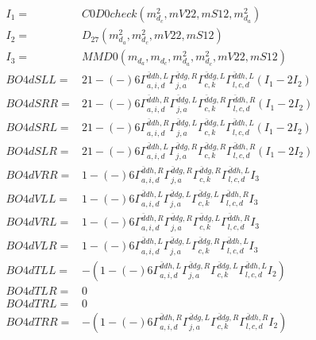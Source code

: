 \documentclass[A4,landscape]{article}
\begin{document}
\begin{align} 
I_1 = & C0D0check(m^2_{d_{{c}}}, mV22, mS12, m^2_{d_{{a}}}) \\ 
I_2 = & D_{27}(m^2_{d_{{a}}}, m^2_{d_{{c}}}, mV22, mS12) \\ 
I_3 = & MMD0(m_{d_{{a}}}, m_{d_{{c}}}, m^2_{d_{{a}}}, m^2_{d_{{c}}}, mV22, mS12) \\ 
  BO4dSLL= & 2   1
-(-)
  6 \Gamma^{\bar{d}d h ,L}_{a, i, d} \Gamma^{\bar{d}d g ,R}_{j, a} \Gamma^{\bar{d}d g ,L}_{c, k} \Gamma^{\bar{d}d h ,L}_{l, c, d} (I_1 - 2 I_2) \\ 
  BO4dSRR= & 2   1
-(-)
  6 \Gamma^{\bar{d}d h ,R}_{a, i, d} \Gamma^{\bar{d}d g ,L}_{j, a} \Gamma^{\bar{d}d g ,R}_{c, k} \Gamma^{\bar{d}d h ,R}_{l, c, d} (I_1 - 2 I_2) \\ 
  BO4dSRL= & 2   1
-(-)
  6 \Gamma^{\bar{d}d h ,R}_{a, i, d} \Gamma^{\bar{d}d g ,L}_{j, a} \Gamma^{\bar{d}d g ,L}_{c, k} \Gamma^{\bar{d}d h ,L}_{l, c, d} (I_1 - 2 I_2) \\ 
  BO4dSLR= & 2   1
-(-)
  6 \Gamma^{\bar{d}d h ,L}_{a, i, d} \Gamma^{\bar{d}d g ,R}_{j, a} \Gamma^{\bar{d}d g ,R}_{c, k} \Gamma^{\bar{d}d h ,R}_{l, c, d} (I_1 - 2 I_2) \\ 
  BO4dVRR= &   1
-(-)
  6 \Gamma^{\bar{d}d h ,R}_{a, i, d} \Gamma^{\bar{d}d g ,R}_{j, a} \Gamma^{\bar{d}d g ,R}_{c, k} \Gamma^{\bar{d}d h ,L}_{l, c, d} I_3 \\ 
  BO4dVLL= &   1
-(-)
  6 \Gamma^{\bar{d}d h ,L}_{a, i, d} \Gamma^{\bar{d}d g ,L}_{j, a} \Gamma^{\bar{d}d g ,L}_{c, k} \Gamma^{\bar{d}d h ,R}_{l, c, d} I_3 \\ 
  BO4dVRL= &   1
-(-)
  6 \Gamma^{\bar{d}d h ,R}_{a, i, d} \Gamma^{\bar{d}d g ,R}_{j, a} \Gamma^{\bar{d}d g ,L}_{c, k} \Gamma^{\bar{d}d h ,R}_{l, c, d} I_3 \\ 
  BO4dVLR= &   1
-(-)
  6 \Gamma^{\bar{d}d h ,L}_{a, i, d} \Gamma^{\bar{d}d g ,L}_{j, a} \Gamma^{\bar{d}d g ,R}_{c, k} \Gamma^{\bar{d}d h ,L}_{l, c, d} I_3 \\ 
  BO4dTLL= & -(  1
-(-)
  6 \Gamma^{\bar{d}d h ,L}_{a, i, d} \Gamma^{\bar{d}d g ,R}_{j, a} \Gamma^{\bar{d}d g ,L}_{c, k} \Gamma^{\bar{d}d h ,L}_{l, c, d} I_2) \\ 
  BO4dTLR= & 0 \\ 
  BO4dTRL= & 0 \\ 
  BO4dTRR= & -(  1
-(-)
  6 \Gamma^{\bar{d}d h ,R}_{a, i, d} \Gamma^{\bar{d}d g ,L}_{j, a} \Gamma^{\bar{d}d g ,R}_{c, k} \Gamma^{\bar{d}d h ,R}_{l, c, d} I_2) \\ 
\end{align} 
\end{document}
